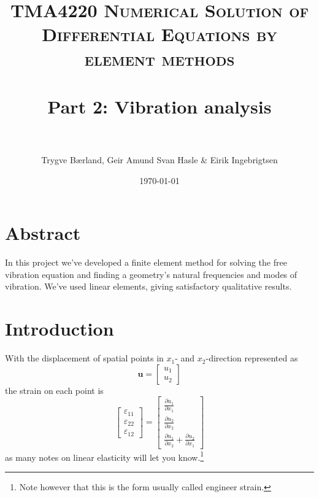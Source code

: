 \documentclass[paper=a4, fontsize=11pt]{scrartcl} %
\title{	
\normalfont \normalsize 
\textsc{TMA4220 Numerical Solution of Differential Equations by element methods} \\ [25pt] %
\horrule{0.5pt} \\[0.4cm] %
\huge Part 2: Vibration analysis \\ %
\horrule{2pt} \\[0.5cm] %
}
\author{Trygve Bærland, Geir Amund Svan Hasle \& Eirik Ingebrigtsen} %
\date{\normalsize\today} %
\begin{document}
\maketitle

\section*{Abstract}
In this project we've developed a finite element method for solving the free vibration equation and finding a geometry's natural frequencies and modes of vibration. We've used linear elements, giving satisfactory qualitative results.
\section*{Introduction}
With the displacement of spatial points in $x_1$- and $x_2$-direction represented as
\begin{equation*}
\boldsymbol{u} = \begin{bmatrix}
u_1 \\ u_2
\end{bmatrix}
\end{equation*}
the strain on each point is
\begin{equation*}
\begin{bmatrix}
\varepsilon_{11} \\
\varepsilon_{22} \\
\varepsilon_{12}
\end{bmatrix}
=
\begin{bmatrix}
\frac{\partial u_1}{\partial x_1} \\
\frac{\partial u_2}{\partial x_2} \\
\frac{\partial u_1}{\partial x_2}+\frac{\partial u_2}{\partial x_1}
\end{bmatrix}
\end{equation*}
as many notes on linear elasticity will let you know.\footnote{Note however that this is the form usually called engineer strain.} 
\end{document}
